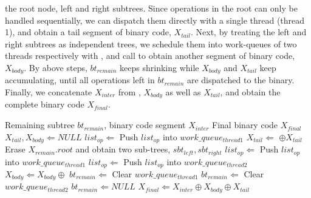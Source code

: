 the root node, left and right subtrees.
Since operations in the root can only be handled sequentially, 
we can dispatch them directly with a single thread (thread 1), 
and obtain a tail segment of binary code, $X_{tail}$.
Next, by treating the left and right subtrees as independent trees, 
we schedule them into work-queues of two threads respectively with ,
and call  to obtain another segment of binary code, $X_{body}$.
By above steps, $bt_{remain}$ keeps shrinking while $X_{body}$ and $X_{tail}$ keep accumulating,
until all operations left in $bt_{remain}$ are dispatched to the binary.
Finally, we concatenate $X_{inter}$ from , $X_{body}$ as well as $X_{tail}$,
and obtain the complete binary code $X_{final}$.
\begin{algorithm}[!ht]
    \caption{}
    \begin{algorithmic}[1]
        \Require    Remaining subtree $bt_{remain}$, binary code segment $X_{inter}$
        \Ensure     Final binary code $X_{final}$
        \State $X_{tail}, X_{body} \Leftarrow NULL$
            \label{line:intra:ws}
        \State $list_{op} \Leftarrow$ 
        \State Push $list_{op}$ into $work\_queue_{thread1}$
        \State $X_{tail} \Leftarrow$  $\oplus X_{tail}$
        \State Erase $X_{remain}.root$ and obtain two sub-trees, $sbt_{left}, sbt_{right}$
        \Statex
        \State $list_{op} \Leftarrow$ 
        \State Push $list_{op}$ into $work\_queue_{thread1}$
        \State $list_{op} \Leftarrow$ 
        \State Push $list_{op}$ into $work\_queue_{thread2}$
        \State $X_{body} \Leftarrow X_{body} \oplus$ 
        \Statex
        \State $bt_{remain} \Leftarrow$ 
        \State Clear $work\_queue_{thread1}$
        \State $bt_{remain} \Leftarrow$ 
        \State Clear $work\_queue_{thread2}$
        \Else
        \State $bt_{remain} \Leftarrow NULL$
        \EndIf
        \EndWhile   \label{line:intra:we}
        \State $X_{final} \Leftarrow X_{inter} \oplus X_{body} \oplus X_{tail}$
        \State {}
    \end{algorithmic}
    \label{alg:intra}
\end{algorithm}
